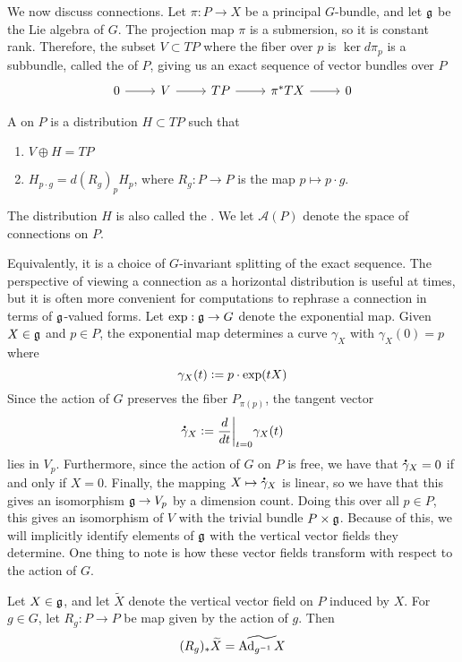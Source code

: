 We now discuss connections. Let $\pi : P \to X$ be a principal $G$-bundle, and
let $\mathfrak{g}$ be the Lie algebra of $G$. The projection map $\pi$ is a submersion,
so it is constant rank. Therefore, the subset $V \subset TP$ where the fiber
over $p$ is $\ker d\pi_p$ is a subbundle, called the 
of $P$, giving us an exact sequence of vector bundles over $P$
\[\begin{tikzcd}
0 \ar[r] & V \ar[r] & TP \ar[r] & \pi^*TX \ar[r] & 0
\end{tikzcd}\]
%
\begin{defn}
A  on $P$ is a distribution $H \subset TP$ such that
\begin{enumerate}
  \item $V \oplus H = TP$ \\
  \item $H_{p \cdot g} = d(R_g)_pH_p$, where $R_g : P \to P$ is the map
  $p \mapsto p\cdot g$.
\end{enumerate}
The distribution $H$ is also called the .
We let $\mathscr{A}(P)$ denote the space of connections on $P$.
\end{defn}
%
Equivalently, it is a choice of $G$-invariant splitting of the exact sequence.
The perspective of viewing a connection as a horizontal distribution is useful
at times, but it is often more convenient for computations to rephrase a connection
in terms of $\mathfrak{g}$-valued forms. Let $\exp : \mathfrak{g} \to G$ denote the exponential map.
Given $X \in \mathfrak{g}$ and $p \in P$, the exponential map determines a curve
$\gamma_X$ with $\gamma_X(0) = p$ where
\[
\gamma_X(t) \vcentcolon= p \cdot \mathrm{exp}(tX)
\]
Since the action of $G$ preserves the fiber $P_{\pi(p)}$, the tangent vector
\[
\accentset{\mbox{\large\bfseries .}}{\gamma}_X \vcentcolon= \frac{d}{dt}\bigg\vert_{t=0} \gamma_X(t)
\]
lies in $V_p$. Furthermore, since the action of $G$ on $P$ is free,
we have that $\accentset{\mbox{\large\bfseries .}}{\gamma}_X = 0$ if and only if $X = 0$. Finally,
the mapping $X \mapsto \accentset{\mbox{\large\bfseries .}}{\gamma}_X$ is linear, so we have that this
gives an isomorphism $\mathfrak{g} \to V_p$ by a dimension count. Doing this
over all $p \in P$, this gives an isomorphism of $V$ with the trivial bundle
$P \times \mathfrak{g}$. Because of this, we will implicitly identify elements of
$\mathfrak{g}$ with the vertical vector fields they determine. One thing to note
is how these vector fields transform with respect to the action of $G$.
%
\begin{prop}
Let $X \in \mathfrak{g}$, and let $\widetilde{X}$ denote the vertical vector field on $P$
induced by $X$. For $g \in G$, let $R_g : P \to P$ be map given by the action of $g$.
Then
\[
(R_g)_*\widetilde{X} = \widetilde{\operatorname{Ad}_{g^{-1}}X}
\]
\end{prop}
